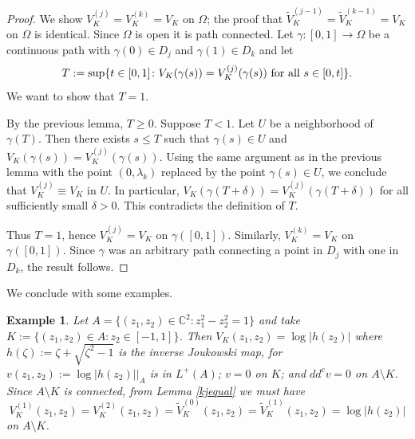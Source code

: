 \documentclass[12pt]{article}
\numberwithin{equation}{section}
\newtheorem{Example}[theorem]{Example}
\newenvironment{example}{\begin{Example}\rm}{\end{Example}}
\newcommand{\C}{\mathbb{C}}
\renewcommand{\tilde}{\widetilde}
\begin{document}
\begin{proof} We show $V_K^{(j)}=V_K^{(k)}=V_K$ on $\Omega$; the proof that $\tilde V_K^{(j-1)}=\tilde V_K^{(k-1)}=V_K$ on $\Omega$ is identical. 
Since $\Omega$ is open it is path connected.  Let $\gamma\colon[0,1]\to\Omega$ be a continuous path with $\gamma(0)\in D_j$ and $\gamma(1)\in D_k$ and let $$T:=\sup\{t\in[0,1]\colon V_K(\gamma(s))=V_K^{(j)}(\gamma(s)) \hbox{ for all } s\in[0,t]\}.$$ 
We want to show that $T=1$.

By the previous lemma, $T\geq 0$. Suppose $T<1$. Let $U$ be a neighborhood of $\gamma(T)$.  Then there exists $s\leq T$ such that $\gamma(s)\in U$ and $V_K(\gamma(s))=V_K^{(j)}(\gamma(s))$.  Using the same argument as in the previous lemma with the point $(0,\lambda_k)$ replaced by the point  $\gamma(s)\in U$, we conclude that $V_K^{(j)}\equiv V_K$ in $U$. In particular, $V_K(\gamma(T+\delta))=V_K^{(j)}(\gamma(T+\delta))$ for all sufficiently small $\delta>0$.  This contradicts the definition of $T$. 

 Thus $T=1$, hence $V_K^{(j)}=V_K$  on $\gamma([0,1])$.  Similarly, $V_K^{(k)}=V_K$ on $\gamma([0,1])$.  Since $\gamma$ was an arbitrary path connecting a point in $D_j$ with one in $D_k$, the result follows.  
\end{proof}



We conclude with some examples.

\begin{example}
Let $A=\{(z_1,z_2)\in\C^2\colon z_1^2-z_2^2=1\}$ and take $K:=\{(z_1,z_2)\in A\colon z_2\in[-1,1]\}$. Then $V_K(z_1,z_2)=\log|h(z_2)|$ where $h(\zeta):=\zeta+\sqrt{\zeta^2-1}$ is the inverse Joukowski map, for $v(z_1,z_2):=\log|h(z_2)||_A$ is in $L^+(A)$; $v=0$ on $K$; and $dd^cv=0$ on $A\setminus K$. Since $A\setminus K$ is connected, from Lemma \ref{kjequal} we must have $$V_K^{(1)}(z_1,z_2)=V_K^{(2)}(z_1,z_2)=\tilde V_K^{(0)}(z_1,z_2)=\tilde V_K^{(1)}(z_1,z_2)=\log|h(z_2)|$$ on $A\setminus K$. 
\end{example}
\end{document}
